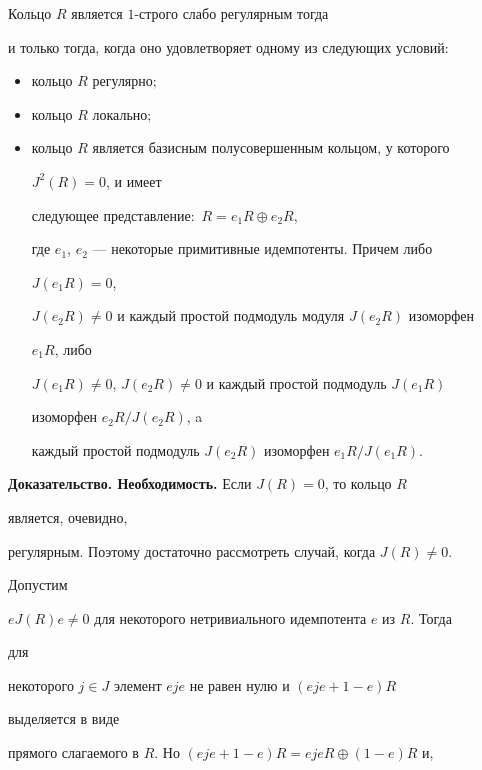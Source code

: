  


\begin{thms} 


Кольцо $R$ является $1$-строго слабо регулярным тогда 


и только тогда, когда оно удовлетворяет одному из следующих условий\/${:}$ 


\begin{itemize} 


\item[1)] кольцо $R$ регулярно\/$;$ 


\item[2)] кольцо $R$ локально\/$;$ 


\item[3)] кольцо $R$ является базисным полусовершенным кольцом, у которого 


$J^2(R)=0$, и имеет  


следующее представление\/${:}$ $R=e_1R\oplus e_2R$, 


где $e_1$, $e_2$ --- некоторые примитивные идемпотенты. Причем либо 


$J(e_1R)=0$,  


$J(e_2R)\ne0$ и каждый простой подмодуль модуля $J(e_2R)$ изоморфен 


$e_1R$, либо  


$J(e_1R)\ne0$, $J(e_2R)\ne0$ и каждый простой подмодуль $J(e_1R)$ 


изоморфен $e_2R/J(e_2R)$, a 


каждый простой подмодуль $J(e_2R)$ изоморфен $e_1R/J(e_1R)$. 


\end{itemize} 


\end{thms} 


 


{\bf Доказательство. Необходимость.} Если $J(R)=0$, то кольцо $R$ 


является, очевидно,  


регулярным. Поэтому достаточно рассмотреть случай, когда $J(R)\ne0$. 


Допустим  


$eJ(R)e\ne0$ для некоторого нетривиального идемпотента $e$ из $R$. Тогда 


для  


некоторого $j\in J$ элемент $eje$ не равен нулю и $(eje+1-e)R$ 


выделяется в виде  


прямого слагаемого в $R$. Но $(eje+1-e)R=eje R\oplus(1-e)R$ и, 


